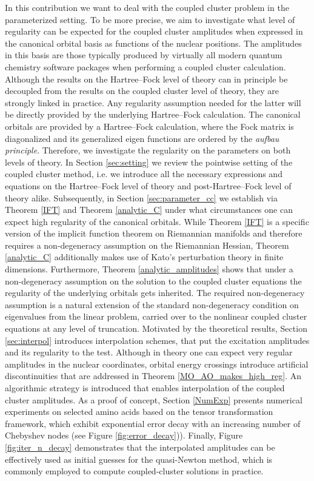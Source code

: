 \documentclass[reqno]{amsart}
\begin{document}
In this contribution we want to deal with the coupled cluster problem in the parameterized setting. To be more precise, we aim to investigate what level of regularity can be expected for the coupled cluster amplitudes when expressed in the canonical orbital basis as functions of the nuclear positions. The amplitudes in this basis are those typically produced by virtually all modern quantum chemistry software packages when performing a coupled cluster calculation. Although the results on the Hartree–Fock level of theory can in principle be decoupled from the results on the coupled cluster level of theory, they are strongly linked in practice. Any regularity assumption needed for the latter will be directly provided by the underlying Hartree–Fock calculation. The canonical orbitals are provided by a Hartree–Fock calculation, where the Fock matrix is diagonalized and its generalized eigen functions are ordered by the \textit{aufbau principle}. Therefore, we investigate the regularity on the parameters on both levels of theory. In Section \ref{sec:setting} we review the pointwise setting of the coupled cluster method, i.e. we introduce all the necessary expressions and equations on the Hartree–Fock level of theory and post-Hartree–Fock level of theory alike. Subsequently, in Section \ref{sec:parameter_cc} we establish via Theorem \ref{IFT} and Theorem \ref{analytic_C} under what circumstances one can expect high regularity of the canonical orbitals. While Theorem \ref{IFT} is a specific version of the implicit function theorem on Riemannian manifolds and therefore requires a non-degeneracy assumption on the Riemannian Hessian, Theorem \ref{analytic_C} additionally makes use of Kato's perturbation theory in finite dimensions. Furthermore, Theorem \ref{analytic_amplitudes} shows that under a non-degeneracy assumption on the solution to the coupled cluster equations the regularity of the underlying orbitals gets inherited. The required non-degeneracy assumption is a natural extension of the standard non-degeneracy condition on eigenvalues from the linear problem, carried over to the nonlinear coupled cluster equations at any level of truncation. Motivated by the theoretical results, Section \ref{sec:interpol} introduces interpolation schemes, that put the excitation amplitudes and its regularity to the test. Although in theory one can expect very regular amplitudes in the nuclear coordinates, orbital energy crossings introduce artificial discontinuities that are addressed in Theorem \ref{MO_AO_makes_high_reg}. An algorithmic strategy is introduced that enables interpolation of the coupled cluster amplitudes. As a proof of concept, Section  \ref{NumExp} presents numerical experiments on selected amino acids based on the tensor transformation framework, which exhibit exponential error decay with an increasing number of Chebyshev nodes (see Figure \ref{fig:error_decay})). Finally, Figure \ref{fig:iter_n_decay} demonstrates that the interpolated amplitudes can be effectively used as initial guesses for the quasi-Newton method, which is commonly employed to compute coupled-cluster solutions in practice.
\end{document}
